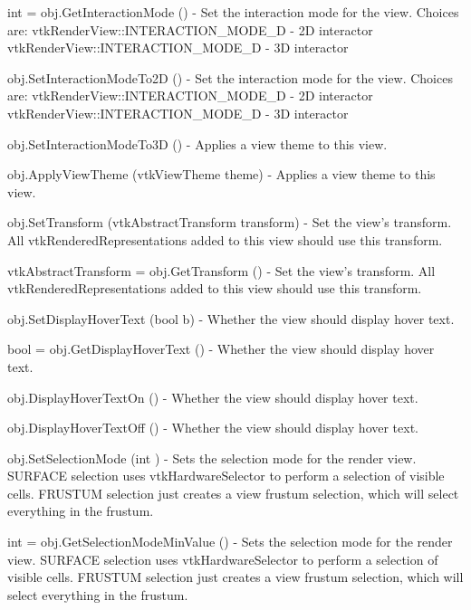\begin{DoxyItemize}
\item {\ttfamily int = obj.\-Get\-Interaction\-Mode ()} -\/ Set the interaction mode for the view. Choices are\-: vtk\-Render\-View\-::\-I\-N\-T\-E\-R\-A\-C\-T\-I\-O\-N\-\_\-\-M\-O\-D\-E\-\_\-D -\/ 2\-D interactor vtk\-Render\-View\-::\-I\-N\-T\-E\-R\-A\-C\-T\-I\-O\-N\-\_\-\-M\-O\-D\-E\-\_\-D -\/ 3\-D interactor  
\item {\ttfamily obj.\-Set\-Interaction\-Mode\-To2\-D ()} -\/ Set the interaction mode for the view. Choices are\-: vtk\-Render\-View\-::\-I\-N\-T\-E\-R\-A\-C\-T\-I\-O\-N\-\_\-\-M\-O\-D\-E\-\_\-D -\/ 2\-D interactor vtk\-Render\-View\-::\-I\-N\-T\-E\-R\-A\-C\-T\-I\-O\-N\-\_\-\-M\-O\-D\-E\-\_\-D -\/ 3\-D interactor  
\item {\ttfamily obj.\-Set\-Interaction\-Mode\-To3\-D ()} -\/ Applies a view theme to this view.  
\item {\ttfamily obj.\-Apply\-View\-Theme (vtk\-View\-Theme theme)} -\/ Applies a view theme to this view.  
\item {\ttfamily obj.\-Set\-Transform (vtk\-Abstract\-Transform transform)} -\/ Set the view's transform. All vtk\-Rendered\-Representations added to this view should use this transform.  
\item {\ttfamily vtk\-Abstract\-Transform = obj.\-Get\-Transform ()} -\/ Set the view's transform. All vtk\-Rendered\-Representations added to this view should use this transform.  
\item {\ttfamily obj.\-Set\-Display\-Hover\-Text (bool b)} -\/ Whether the view should display hover text.  
\item {\ttfamily bool = obj.\-Get\-Display\-Hover\-Text ()} -\/ Whether the view should display hover text.  
\item {\ttfamily obj.\-Display\-Hover\-Text\-On ()} -\/ Whether the view should display hover text.  
\item {\ttfamily obj.\-Display\-Hover\-Text\-Off ()} -\/ Whether the view should display hover text.  
\item {\ttfamily obj.\-Set\-Selection\-Mode (int )} -\/ Sets the selection mode for the render view. S\-U\-R\-F\-A\-C\-E selection uses vtk\-Hardware\-Selector to perform a selection of visible cells. F\-R\-U\-S\-T\-U\-M selection just creates a view frustum selection, which will select everything in the frustum.  
\item {\ttfamily int = obj.\-Get\-Selection\-Mode\-Min\-Value ()} -\/ Sets the selection mode for the render view. S\-U\-R\-F\-A\-C\-E selection uses vtk\-Hardware\-Selector to perform a selection of visible cells. F\-R\-U\-S\-T\-U\-M selection just creates a view frustum selection, which will select everything in the frustum.  

\end{DoxyItemize}
